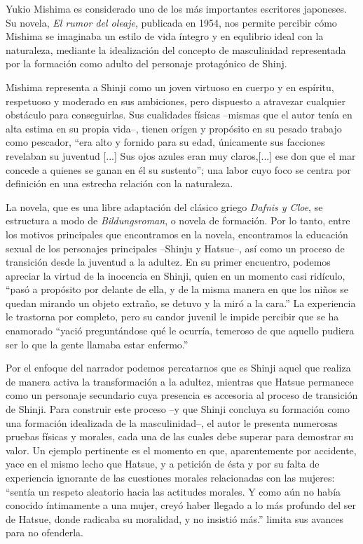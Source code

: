 Yukio Mishima es considerado uno de los más importantes escritores japoneses.
Su novela, \emph{El rumor del oleaje}, publicada en 1954,  nos permite percibir cómo Mishima se imaginaba un estilo de vida íntegro y en equlibrio ideal con la naturaleza, mediante la idealización del concepto de  masculinidad representada por la formación como adulto del  personaje protagónico de Shinj.

Mishima representa a Shinji como un joven virtuoso en cuerpo y en espíritu, respetuoso y moderado en sus ambiciones, pero dispuesto a atravezar cualquier obstáculo para conseguirlas. Sus cualidades físicas --mismas que el autor tenía en alta estima en su propia vida--, tienen orígen y propósito en su pesado trabajo como pescador, ``era alto y fornido para su edad, únicamente sus facciones revelaban su juventud [...] Sus ojos azules eran muy claros,[...] ese don que el mar concede a quienes se ganan en él su sustento''; una labor cuyo foco se centra por definición en una estrecha relación con la naturaleza.

La novela, que es una libre adaptación del clásico griego \emph{Dafnis y Cloe}, se estructura a modo de \emph{Bildungsroman}, o novela de formación. Por lo tanto, entre los motivos principales que encontramos en la novela, encontramos la educación sexual de los personajes principales --Shinju y Hatsue--, así como un proceso de transición desde la juventud a la adultez. En su primer encuentro, podemos apreciar la virtud de la inocencia en Shinji, quien en un momento casi ridículo, ``pasó a propósito por delante de ella, y de la misma manera en que los niños se quedan mirando un objeto extraño, se detuvo y la miró a la cara.''%
La experiencia le trastorna por completo, pero su candor juvenil le impide percibir que se ha enamorado  ``yació preguntándose qué le ocurría, temeroso de que aquello pudiera ser lo que la gente llamaba estar enfermo.'' %

Por el enfoque del narrador podemos percatarnos que es Shinji aquel que realiza de manera activa la transformación a la adultez, mientras que Hatsue permanece como un personaje secundario cuya presencia es accesoria al proceso de transición de Shinji. Para construir este proceso --y que Shinji concluya su formación como una formación idealizada de la masculinidad--, el autor le presenta numerosas pruebas físicas y morales, cada una de las cuales debe superar para demostrar su valor. Un ejemplo pertinente es el momento en que, aparentemente por accidente, yace en el mismo lecho que Hatsue, y a petición de ésta y por su falta de experiencia ignorante de las cuestiones morales relacionadas con las mujeres: ``sentía un respeto aleatorio hacia las actitudes morales. Y como aún no había conocido íntimamente a una mujer, creyó haber llegado a lo más profundo del ser de Hatsue, donde radicaba su moralidad, y no insistió más.'' limita sus avances para no ofenderla.

